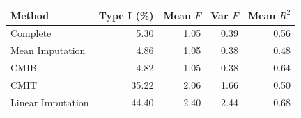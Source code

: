 
\begin{tabular}{lrrrr}
\toprule
Method & Type I (\%) & Mean $F$ & Var $F$ & Mean $R^2$\\
\midrule
Complete & 5.30 & 1.05 & 0.39 & 0.56\\
Mean Imputation & 4.86 & 1.05 & 0.38 & 0.48\\
CMIB & 4.82 & 1.05 & 0.38 & 0.64\\
CMIT & 35.22 & 2.06 & 1.66 & 0.50\\
Linear Imputation & 44.40 & 2.40 & 2.44 & 0.68\\
\bottomrule
\end{tabular}
